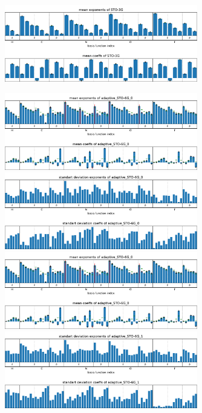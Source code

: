 \begin{figure}
    \includegraphics[width=0.75\textwidth]{chapters/results/results_images/adaptive_basis_functions/mean_exps_and_coeffsSTO-3G}
\end{figure}

\begin{figure}
    \centering
    \includegraphics[width=0.75\textwidth]{chapters/results/results_images/adaptive_basis_functions/mean_exps_and_coeffsadaptive_STO-6G_0}
    \includegraphics[width=0.75\textwidth]{chapters/results/results_images/adaptive_basis_functions/std_exps_and_coeffsadaptive_STO-6G_0}
    \includegraphics[width=0.75\textwidth]{chapters/results/results_images/adaptive_basis_functions/mean_exps_and_coeffsadaptive_STO-6G_0}
    \includegraphics[width=0.75\textwidth]{chapters/results/results_images/adaptive_basis_functions/std_exps_and_coeffsadaptive_STO-6G_1}
\end{figure}

